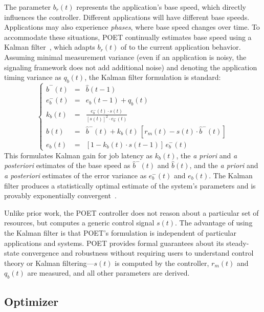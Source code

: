 The parameter $b_r(t)$ represents the application's base speed, which directly influences the controller.
Different applications will have different base speeds.
Applications may also experience \emph{phases}, where base speed changes over time.
To accommodate these situations, POET continually estimates base speed using a Kalman filter~\cite{welch2006kalman}, which adapts $b_r(t)$ of  to the current application behavior.
Assuming minimal measurement variance (\ie even if an application is noisy, the signaling framework does not add additional noise) and denoting the application timing variance as $q_b(t)$, the Kalman filter formulation is standard:
\begin{equation}
\left \lbrace
\begin{array}{rcl}
\hat{b}^{-}(t) & = & \hat{b}(t-1) \\
e^{-}_{b}(t) & = & e_{b}(t-1) + q_b(t) \\
k_b(t) 
  & = & \frac{e^{-}_{b}(t) \cdot s(t)}{[s(t)]^2
        \cdot e^{-}_{b}(t)} \\
\hat{b}(t) 
  & = & \hat{b}^{-}(t) + k_b(t) 
        \, \left[ r_m(t) - s(t) \cdot \hat{b}^{-}(t) \right] \\
e_{b}(t) & = & [1 - k_b(t) \cdot s(t-1)] \, e^{-}_{b}(t)
\end{array}
\right .
\label{eqn:kalman-filter}
\end{equation}
This formulates Kalman gain for job latency as $k_b(t)$, the \emph{a priori} and \emph{a posteriori} estimates of the base speed as $\hat{b}^{-}(t)$ and $\hat{b}(t)$, and the \emph{a priori} and \emph{a posteriori} estimates of the error variance as $e^{-}_{b}(t)$ and $e_{b}(t)$.
The Kalman filter produces a statistically optimal estimate of the system's parameters and is provably exponentially convergent~\cite{CaoSchwartz2003}.

Unlike prior work, the POET controller does not reason about a particular set of resources, but computes a generic control signal $s(t)$.
The advantage of using the Kalman filter is that POET's formulation is independent of particular applications and systems.
POET provides formal guarantees about its steady-state convergence and robustness without requiring users to understand control theory or Kalman filtering---$s(t)$ is computed by the controller, $r_m(t)$ and $q_b(t)$ are measured, and all other parameters are derived.


\subsection{Optimizer}
\label{sec:poet-optimizer}

